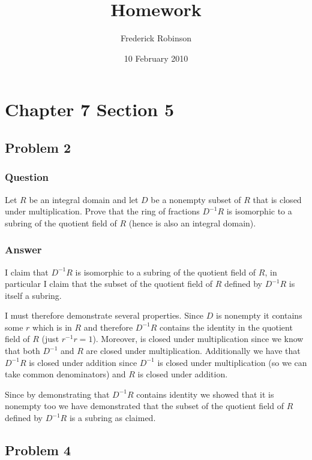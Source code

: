\documentclass[12pt]{article}
\title{Homework}
\author{Frederick Robinson}
\date{10 February 2010}
\begin{document}

   \maketitle

\setcounter{tocdepth}{2} 

\tableofcontents

\section{Chapter 7 Section 5}
\subsection{Problem 2}

\subsubsection{Question}
Let $R$ be an integral domain and let $D$ be a nonempty subset of $R$ that is closed under multiplication.  Prove that the ring of fractions $D^{-1}R$ is isomorphic to a subring of the quotient field of $R$ (hence is also an integral domain).
\subsubsection{Answer}
I claim that $D^{-1}R$ is isomorphic to a subring of the quotient field of $R$, in particular I claim that the subset of the quotient field of $R$ defined by $D^{-1}R$ is itself a subring.

I must therefore demonstrate several properties. Since $D$ is nonempty it contains some $r$ which is in $R$ and therefore $D^{-1}R$ contains the identity in the quotient field of $R$ (just $r^{-1}r=1$). Moreover, is closed under multiplication since we know that both $D^{-1}$ and $R$ are closed under multiplication. Additionally we have that $D^{-1}R$ is closed under addition since $D^{-1}$ is closed under multiplication (so we can take common denominators) and $R$ is closed under addition.

Since by demonstrating that $D^{-1}R$ contains identity we showed that it is nonempty too we have demonstrated that the subset of the quotient field of $R$ defined by $D^{-1}R$ is a subring as claimed.

\subsection{Problem 4}
\end{document}
